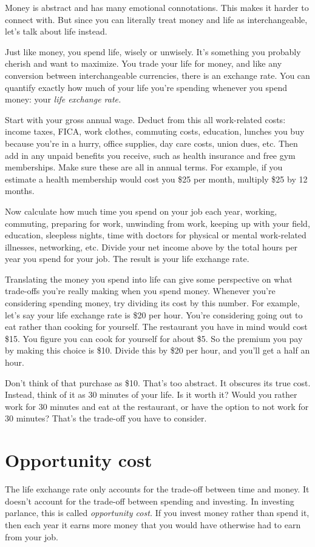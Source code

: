 Money is abstract and has many emotional connotations. This makes it harder to connect with. But since you can literally treat money and life as interchangeable, let's talk about life instead.

Just like money, you spend life, wisely or unwisely. It's something you probably cherish and want to maximize. You trade your life for money, and like any conversion between interchangeable currencies, there is an exchange rate. You can quantify exactly how much of your life you're spending whenever you spend money: your \emph{life exchange rate.}

Start with your gross annual wage. Deduct from this all work-related costs: income taxes, FICA, work clothes, commuting costs, education, lunches you buy because you're in a hurry, office supplies, day care costs, union dues, etc. Then add in any unpaid benefits you receive, such as health insurance and free gym memberships. Make sure these are all in annual terms. For example, if you estimate a health membership would cost you \$25 per month, multiply \$25 by 12 months.

Now calculate how much time you spend on your job each year, working, commuting, preparing for work, unwinding from work, keeping up with your field, education, sleepless nights, time with doctors for physical or mental work-related illnesses, networking, etc. Divide your net income above by the total hours per year you spend for your job. The result is your life exchange rate.

Translating the money you spend into life can give some perspective on what trade-offs you're really making when you spend money. Whenever you're considering spending money, try dividing its cost by this number. For example, let's say your life exchange rate is \$20 per hour. You're considering going out to eat rather than cooking for yourself. The restaurant you have in mind would cost \$15. You figure you can cook for yourself for about \$5. So the premium you pay by making this choice is \$10. Divide this by \$20 per hour, and you'll get a half an hour.

Don't think of that purchase as \$10. That's too abstract. It obscures its true cost. Instead, think of it as 30 minutes of your life. Is it worth it? Would you rather work for 30 minutes and eat at the restaurant, or have the option to not work for 30 minutes? That's the trade-off you have to consider.

\section{Opportunity cost}
The life exchange rate only accounts for the trade-off between time and money. It doesn't account for the trade-off between spending and investing. In investing parlance, this is called \emph{opportunity cost.} If you invest money rather than spend it, then each year it earns more money that you would have otherwise had to earn from your job.

